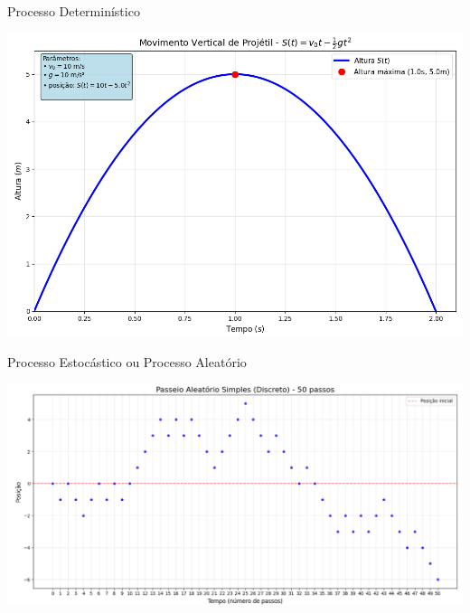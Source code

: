 \documentclass{beamer}
\begin{document}
\begin{frame}{Processo Determinístico}

\includegraphics[width=\textwidth]{projetil.png}

\end{frame}

\begin{frame}{Processo Estocástico ou Processo Aleatório}

\includegraphics[width=\textwidth]{srw0.png}

\end{frame}

\end{document}
